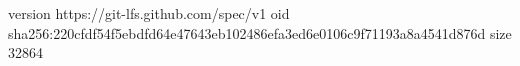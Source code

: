 version https://git-lfs.github.com/spec/v1
oid sha256:220cfdf54f5ebdfd64e47643eb102486efa3ed6e0106c9f71193a8a4541d876d
size 32864
